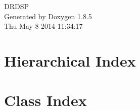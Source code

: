 \documentclass[twoside]{book}
\newcommand{\clearemptydoublepage}{%
  \newpage{\pagestyle{empty}\cleardoublepage}%
}
\begin{document}
\hypersetup{pageanchor=false}
\begin{titlepage}
\vspace*{7cm}
\begin{center}%
{\Large D\-R\-D\-S\-P }\\
\vspace*{1cm}
{\large Generated by Doxygen 1.8.5}\\
\vspace*{0.5cm}
{\small Thu May 8 2014 11:34:17}\\
\end{center}
\end{titlepage}
\clearemptydoublepage
\tableofcontents
\clearemptydoublepage
{}
\hypersetup{pageanchor=true}

\chapter{Hierarchical Index}

\chapter{Class Index}

\end{document}
